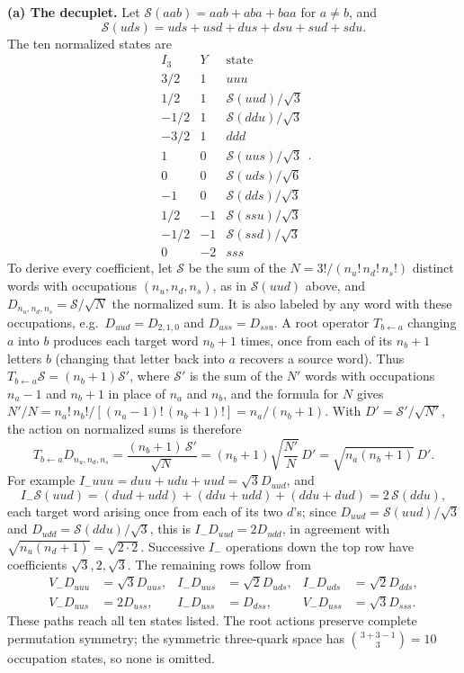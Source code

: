 \textbf{(a) The decuplet.}
Let $\mathcal S(aab)=aab+aba+baa$ for $a\ne b$, and
\[
\mathcal S(uds)=uds+usd+dus+dsu+sud+sdu.
\]
The ten normalized states are
\[
\boxed{\begin{array}{c|c|l}
I_3&Y&\text{state}\\\hline
3/2&1&uuu\\
1/2&1&\mathcal S(uud)/\sqrt3\\
-1/2&1&\mathcal S(ddu)/\sqrt3\\
-3/2&1&ddd\\
1&0&\mathcal S(uus)/\sqrt3\\
0&0&\mathcal S(uds)/\sqrt6\\
-1&0&\mathcal S(dds)/\sqrt3\\
1/2&-1&\mathcal S(ssu)/\sqrt3\\
-1/2&-1&\mathcal S(ssd)/\sqrt3\\
0&-2&sss
\end{array}}.
\]
To derive every coefficient, let $\mathcal S$ be the sum of the
$N=3!/(n_u!\,n_d!\,n_s!)$ distinct words with occupations
$(n_u,n_d,n_s)$, as in $\mathcal S(uud)$ above, and
$D_{n_u,n_d,n_s}=\mathcal S/\sqrt N$ the normalized sum. It is also
labeled by any word with these occupations, e.g.\
$D_{uud}=D_{2,1,0}$ and $D_{uss}=D_{ssu}$.
A root operator $T_{b\leftarrow a}$ changing $a$ into $b$ produces
each target word $n_b+1$ times, once from each of its $n_b+1$
letters $b$ (changing that letter back into $a$ recovers a source
word). Thus $T_{b\leftarrow a}\mathcal S=(n_b+1)\mathcal S'$, where
$\mathcal S'$ is the sum of the $N'$ words with occupations
$n_a-1$ and $n_b+1$ in place of $n_a$ and $n_b$, and the formula for
$N$ gives $N'/N=n_a!\,n_b!/[(n_a-1)!\,(n_b+1)!]=n_a/(n_b+1)$.
With $D'=\mathcal S'/\sqrt{N'}$, the action on normalized sums is
therefore
\[
T_{b\leftarrow a}D_{n_u,n_d,n_s}
=\frac{(n_b+1)\,\mathcal S'}{\sqrt N}
=(n_b+1)\sqrt{\frac{N'}{N}}\,D'
=\sqrt{n_a(n_b+1)}\,D'.
\]
For example $I_-uuu=duu+udu+uud=\sqrt3D_{uud}$, and
\[
I_-\mathcal S(uud)=(dud+udd)+(ddu+udd)+(ddu+dud)=2\,\mathcal S(ddu),
\]
each target word arising once from each of its two $d$'s; since
$D_{uud}=\mathcal S(uud)/\sqrt3$ and $D_{udd}=\mathcal S(ddu)/\sqrt3$,
this is $I_-D_{uud}=2D_{udd}$, in agreement with
$\sqrt{n_u(n_d+1)}=\sqrt{2\cdot2}$.
Successive $I_-$ operations down the top row have coefficients
$\sqrt3,2,\sqrt3$.
The remaining rows follow from
\[
\begin{aligned}
V_-D_{uuu}&=\sqrt3D_{uus},&
I_-D_{uus}&=\sqrt2D_{uds},&
I_-D_{uds}&=\sqrt2D_{dds},\\
V_-D_{uus}&=2D_{uss},&
I_-D_{uss}&=D_{dss},&
V_-D_{uss}&=\sqrt3D_{sss}.
\end{aligned}
\]
These paths reach all ten states listed. The root actions preserve
complete permutation symmetry; the symmetric three-quark space
has $\binom{3+3-1}{3}=10$ occupation states, so none is omitted.

